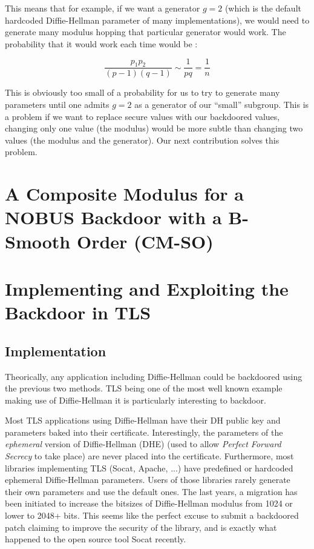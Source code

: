 \documentclass[a4paper,11pt,twocolumn]{article}
\begin{document}
This means that for example, if we want a generator $g=2$ (which is the default hardcoded Diffie-Hellman parameter of many implementations), we would need to generate many modulus hopping that particular generator would work. The probability that it would work each time would be :

$$\frac{p_1 p_2}{(p-1)(q-1)} \sim \frac{1}{pq} = \frac{1}{n} $$

This is obviously too small of a probability for us to try to generate many parameters until one admits $g=2$ as a generator of our ``small'' subgroup. This is a problem if we want to replace secure values with our backdoored values, changing only one value (the modulus) would be more subtle than changing two values (the modulus and the generator). Our next contribution solves this problem.

\section{A Composite Modulus for a NOBUS Backdoor with a B-Smooth Order (CM-SO)}



\section{Implementing and Exploiting the Backdoor in TLS}

\subsection{Implementation}

Theorically, any application including Diffie-Hellman could be backdoored using the previous two methods. TLS being one of the most well known example making use of Diffie-Hellman it is particularly interesting to backdoor.

Most TLS applications using Diffie-Hellman have their DH public key and parameters baked into their certificate. Interestingly, the parameters of the \emph{ephemeral} version of Diffie-Hellman (DHE) (used to allow \emph{Perfect Forward Secrecy} to take place) are never placed into the certificate. Furthermore, most libraries implementing TLS (Socat, Apache, ...) have predefined or hardcoded ephemeral Diffie-Hellman parameters. Users of those libraries rarely generate their own parameters and use the default ones. The last years, a migration has been initiated to increase the bitsizes of Diffie-Hellman modulus from 1024 or lower to 2048+ bits. This seems like the perfect excuse to submit a backdoored patch claiming to improve the security of the library, and is exactly what happened to the open source tool Socat recently.
\end{document}
